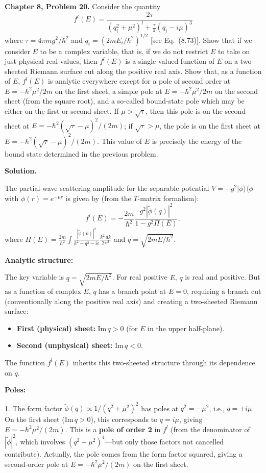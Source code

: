 \documentclass[12pt]{article}
\begin{document}
\textbf{Chapter 8, Problem 20.} Consider the quantity
\[
f^l(E) = \frac{2\tau}{(q_i^2+\mu^2)^l + \frac{\tau}{\pi}(q_i-i\mu)^3}
\]
where $\tau = 4\pi mg^2/\hbar^2$ and $q_i = (2mE_i/\hbar^2)^{1/2}$ [see Eq.\ (8.73)]. Show that if we consider $E$ to be a complex variable, that is, if we do not restrict $E$ to take on just physical real values, then $f^l(E)$ is a single-valued function of $E$ on a two-sheeted Riemann surface cut along the positive real axis. Show that, as a function of $E$, $f^l(E)$ is analytic everywhere except for a pole of second order at $E = -\hbar^2\mu^2/2m$ on the first sheet, a simple pole at $E = -\hbar^2\mu^2/2m$ on the second sheet (from the square root), and a so-called bound-state pole which may be either on the first or second sheet. If $\mu > \sqrt{\tau}$, then this pole is on the second sheet at $E = -\hbar^2(\sqrt{\tau}-\mu)^2/(2m)$; if $\sqrt{\tau}>\mu$, the pole is on the first sheet at $E = -\hbar^2(\sqrt{\tau}-\mu)^2/(2m)$. This value of $E$ is precisely the energy of the bound state determined in the previous problem.

\bigskip
\textbf{Solution.}

The partial-wave scattering amplitude for the separable potential $V = -g^2|\phi\rangle\langle\phi|$ with $\phi(r) = e^{-\mu r}$ is given by (from the $T$-matrix formalism):
\[
f^l(E) = -\frac{2m}{\hbar^2}\frac{g^2|\tilde\phi(q)|^2}{1-g^2\Pi(E)},
\]
where $\Pi(E) = \frac{2m}{\hbar^2}\int\frac{|\tilde\phi(k)|^2}{k^2-q^2-i\epsilon}\frac{k^2\,dk}{2\pi^2}$ and $q = \sqrt{2mE/\hbar^2}$.

\textbf{Analytic structure:}

The key variable is $q = \sqrt{2mE/\hbar^2}$. For real positive $E$, $q$ is real and positive. But as a function of complex $E$, $q$ has a branch point at $E=0$, requiring a branch cut (conventionally along the positive real axis) and creating a two-sheeted Riemann surface:
\begin{itemize}
\item \textbf{First (physical) sheet:} $\text{Im}\,q > 0$ (for $E$ in the upper half-plane).
\item \textbf{Second (unphysical) sheet:} $\text{Im}\,q < 0$.
\end{itemize}

The function $f^l(E)$ inherits this two-sheeted structure through its dependence on $q$.

\textbf{Poles:}

1. The form factor $\tilde\phi(q) \propto 1/(q^2+\mu^2)^2$ has poles at $q^2 = -\mu^2$, i.e., $q = \pm i\mu$. On the first sheet ($\text{Im}\,q>0$), this corresponds to $q = i\mu$, giving $E = -\hbar^2\mu^2/(2m)$. This is a \textbf{pole of order 2} in $f^l$ (from the denominator of $|\tilde\phi|^2$, which involves $(q^2+\mu^2)^4$---but only those factors not cancelled contribute). Actually, the pole comes from the form factor squared, giving a second-order pole at $E = -\hbar^2\mu^2/(2m)$ on the first sheet.
\end{document}
